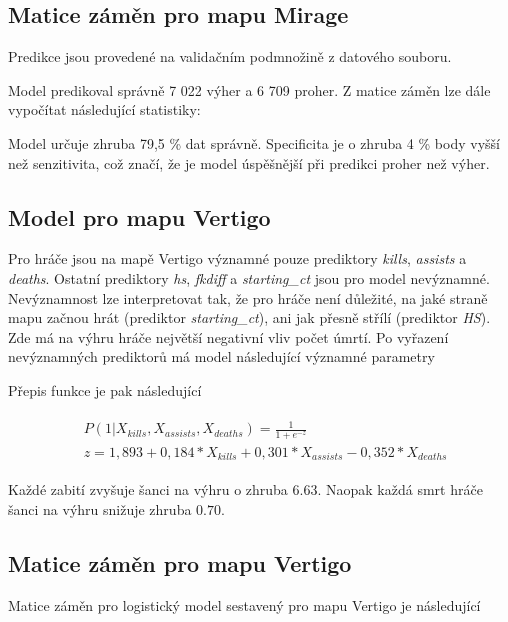 \subsection{Matice záměn pro mapu Mirage}
Predikce jsou provedené na validačním podmnožině z datového souboru.



Model predikoval správně 7 022 výher a 6 709 proher. Z matice záměn lze dále vypočítat následující statistiky:



Model určuje zhruba 79,5 \% dat správně. Specificita je o zhruba 4 \% body vyšší než senzitivita, což značí, že je model úspěšnější při predikci proher
než výher.

\subsection{Model pro mapu Vertigo}



Pro hráče jsou na mapě Vertigo významné pouze prediktory \textit{kills}, \textit{assists} a \textit{deaths}. Ostatní prediktory \textit{hs}, \textit{fkdiff} a \textit{starting\_ct}
jsou pro model nevýznamné. Nevýznamnost lze interpretovat tak, že pro hráče není důležité, na jaké straně mapu začnou hrát (prediktor  \textit{starting\_ct}), ani jak přesně
střílí (prediktor \textit{HS}). Zde má na výhru hráče největší negativní vliv počet úmrtí. Po vyřazení nevýznamných prediktorů má model následující významné parametry



Přepis funkce je pak následující

\begin{align}
    \begin{split}
        &P(1 | X_{kills}, X_{assists}, X_{deaths}) = \frac{1}{1 + e^{-z}} \\
        &z = 1,893 + 0,184*X_{kills} + 0,301*X_{assists} - 0,352*X_{deaths}
    \end{split}
\end{align}

Každé zabití zvyšuje šanci na výhru o zhruba $6.63$. Naopak každá smrt hráče šanci na výhru snižuje zhruba $0.70$.

\newpage
\subsection{Matice záměn pro mapu Vertigo}
Matice záměn pro logistický model sestavený pro mapu Vertigo je následující

